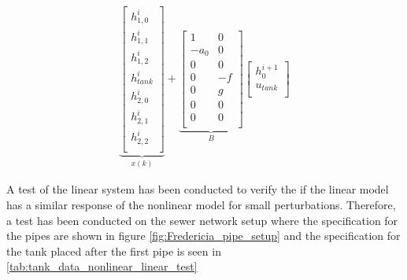 \begin{equation}
\begin{aligned}
            \underbrace{\begin{bmatrix}
        h_{1,0}^{i} \\
        h_{1,1}^{i} \\
        h_{1,2}^{i} \\
        h_{tank}^{i}\\
        h_{2,0}^{i}\\
        h_{2,1}^{i}\\
          h_{2,2}^{i}\\
        \end{bmatrix}}_{x(k)}
    +  \underbrace{\begin{bmatrix}
         1 & 0\\
         -a_0& 0 \\
         0 & 0\\
          0& -f \\
          0& g \\ 
          0& 0 \\
          0& 0 \\
        \end{bmatrix}}_{B}
        \begin{bmatrix}
        h_0^{i+1}\\
        u_{tank} \\
        \end{bmatrix}
    \end{aligned}
\end{equation}

A test of the linear system has been conducted to verify the if the linear model has a similar response of the nonlinear model for small perturbations. Therefore, a test has been conducted on the sewer network setup where the specification for the pipes are shown in figure \ref{fig:Fredericia_pipe_setup} and the specification for the tank placed after the first pipe is seen in \ref{tab:tank_data_nonlinear_linear_test} 


